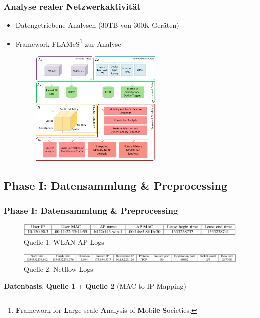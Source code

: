 \documentclass{beamer}
\begin{document}
\begin{frame}
\frametitle{Analyse realer Netzwerkaktivität}
\begin{itemize}
  \item Datengetriebene Analysen ($30$\textsc{TB} von $300$\textsc{K} Geräten)
  \item Framework FLAMeS\footnote{\textbf{F}ramework for \textbf{L}arge-scale \textbf{A}nalysis of 
  \textbf{M}obil\textbf{e} \textbf{S}ocieties.} zur Analyse
  \begin{figure}
    \centering
    \includegraphics[width=0.6\textwidth]{images/FLAMeS.png}\newline  
  \end{figure}  
\end{itemize}
\end{frame}

\subsection{\textbf{Phase I}: Datensammlung \& Preprocessing}

\begin{frame}
  \frametitle{Phase I: Datensammlung \& Preprocessing}

  \begin{figure}
    \centering
    \includegraphics[width=\textwidth]{images/AP_entry.png}
    \caption*{Quelle 1: WLAN-AP-Logs}
  \end{figure}

  \begin{figure}
    \centering
    \includegraphics[width=1\textwidth]{images/netflow_entry.png}
    \caption*{Quelle 2: Netflow-Logs}
  \end{figure}
  
  \textbf{Datenbasis}: \textbf{Quelle 1} + \textbf{Quelle 2} (MAC-to-IP-Mapping)
\end{frame}
\end{document}
